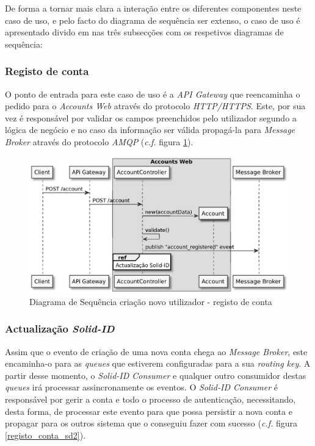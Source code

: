 De forma a tornar mais clara a interação entre os diferentes componentes neste caso de uso, e pelo facto do diagrama de sequência ser extenso, o caso de uso é apresentado divido em nas três subsecções com os respetivos diagramas de sequência:

\subsubsection{Registo de conta}

O ponto de entrada para este caso de uso é a \emph{API Gateway} que reencaminha o pedido para o \emph{Accounts Web} através do protocolo \emph{HTTP/HTTPS}. Este, por sua vez é responsável por validar os campos preenchidos pelo utilizador segundo a lógica de negócio e no caso da informação ser válida propagá-la para \emph{Message Broker} através do protocolo \emph{AMQP} (\emph{c.f.} figura \ref{registo_conta_sd1}).

\begin{figure}[H]
    \begin{center}
    \includegraphics[width=1 \textwidth]{figures/create_account_sd_diagram_1.eps}
    \caption{Diagrama de Sequência criação novo utilizador - registo de conta}
    \label{registo_conta_sd1}
    \end{center}
\end{figure}

\subsubsection{Actualização \emph{Solid-ID}}

Assim que o evento de criação de uma nova conta chega ao \emph{Message Broker}, este encaminha-o para as \emph{queues} que estiverem configuradas para a sua \emph{routing key}. A partir desse momento, o \emph{Solid-ID Consumer} e qualquer outro consumidor  destas \emph{queues} irá processar assincronamente os eventos. O \emph{Solid-ID Consumer} é responsável por gerir a conta e todo o processo de autenticação, necessitando, desta forma, de processar este evento para que possa persistir a nova conta e propagar para os outros sistema que o conseguiu fazer com sucesso (\emph{c.f.} figura \ref{registo_conta_sd2}).

